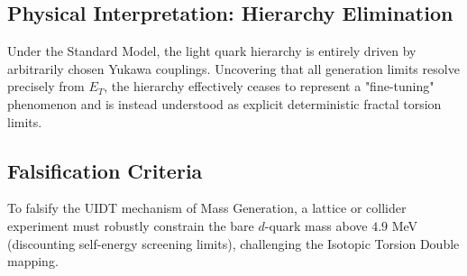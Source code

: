 \subsection{Physical Interpretation: Hierarchy Elimination}
\label{app_sec:hierarchy_resolution}

Under the Standard Model, the light quark hierarchy is entirely driven by arbitrarily chosen Yukawa couplings. Uncovering that all generation limits resolve precisely from $E_T$, the hierarchy effectively ceases to represent a "fine-tuning" phenomenon and is instead understood as explicit deterministic fractal torsion limits.

\subsection{Falsification Criteria}
\label{app_sec:falsification_quarks}

To falsify the UIDT mechanism of Mass Generation, a lattice or collider experiment must robustly constrain the bare $d$-quark mass above $4.9$ MeV (discounting self-energy screening limits), challenging the Isotopic Torsion Double mapping.

